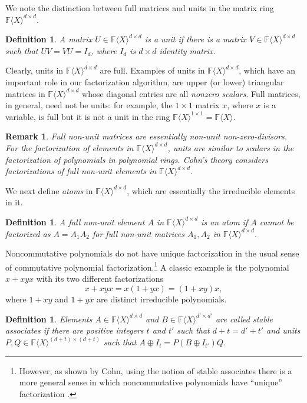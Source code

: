 \documentclass[10pt,a4paper]{article}
\newtheorem{definition}[theorem]{Definition}
\newtheorem{remark}[theorem]{Remark}
\newcommand{\F}{\mathbb{F}}
\renewcommand{\angle}[1]{\langle #1 \rangle}
\newcommand{\FX}{\F\angle{X}}
\newcommand{\fR}{\FX}
\begin{document}
We note the distinction between full matrices and units in the matrix
ring $\fR^{d\times d}$.

\begin{definition}
A matrix $U \in \fR^{d\times d}$ is a \emph{unit} if there is a matrix
$V\in \fR^{d\times d}$ such that $UV=VU=I_d$, where $I_d$ is $d \times
d$ identity matrix.
\end{definition}

Clearly, units in $\fR^{d \times d}$ are full. Examples of units in
$\fR^{d\times d}$, which have an important role in our factorization
algorithm, are upper (or lower) triangular matrices in $\fR^{d \times
  d}$ whose diagonal entries are all \emph{nonzero scalars}. Full
matrices, in general, need not be units: for example, the $1\times 1$
matrix $x$, where $x$ is a variable, is full but it is not a unit in
the ring $\fR^{1\times 1}=\fR$.

\begin{remark}
Full non-unit matrices are essentially non-unit non-zero-divisors.
For the factorization of elements in $\fR^{d \times d}$, units are
similar to scalars in the factorization of polynomials in polynomial
rings. Cohn's theory \cite{Cohnfir} considers factorizations of full
non-unit elements in $\fR^{d \times d}$.
\end{remark}
%
%
We next define \emph{atoms} in $\fR^{d\times d}$, which are
essentially the irreducible elements in it.

\begin{definition}
A full non-unit element $A$ in $\fR^{d \times d}$ is an \emph{atom} if
$A$ cannot be factorized as $A=A_1A_2$ for full non-unit matrices
$A_1, A_2$ in $\fR^{d \times d}$.
\end{definition}

Noncommutative polynomials do not have unique factorization in the usual
sense of commutative polynomial factorization.\footnote{However, as
  shown by Cohn, using the notion of stable associates there is a more
  general sense in which noncommutative polynomials have ``unique''
  factorization \cite{Cohnfir}.}  A classic example \cite{Cohnfir} is
the polynomial $x+xyx$ with its two different factorizations
\[
x+xyx = x(1+yx) = (1+xy)x,
\]
where $1+xy$ and $1+yx$ are distinct irreducible polynomials.

\begin{definition}
Elements $A \in \fR^{d \times d}$ and $B \in \fR^{d' \times d'}$ are
called \emph{stable associates} if there are positive integers $t$ and
$t'$ such that $d+t=d'+t'$ and units $P, Q\in\fR^{(d+t)\times (d+t)}$
such that $A\oplus I_t=P(B \oplus I_{t'})Q$.
\end{definition}
\end{document}
